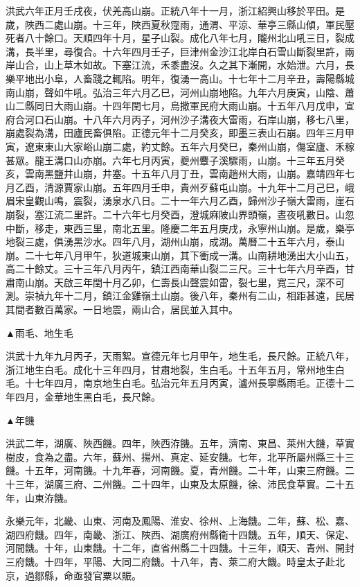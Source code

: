 \begin{pinyinscope}
洪武六年正月壬戌夜，伏羌高山崩。正統八年十一月，浙江紹興山移於平田。是歲，陜西二處山崩。十三年，陜西夏秋霪雨，通渭、平涼、華亭三縣山傾，軍民壓死者八十餘口。天順四年十月，星子山裂。成化八年七月，隴州北山吼三日，裂成溝，長半里，尋復合。十六年四月壬子，巨津州金沙江北岸白石雪山斷裂里許，兩岸山合，山上草木如故。下塞江流，禾黍盡沒。久之其下漸開，水始泄。六月，長樂平地出小阜，人畜踐之輒陷。明年，復湧一高山。十七年十二月辛丑，壽陽縣城南山崩，聲如牛吼。弘治三年六月乙巳，河州山崩地陷。九年六月庚寅，山陰、蕭山二縣同日大雨山崩。十四年閏七月，烏撒軍民府大雨山崩。十五年八月戊申，宣府合河口石山崩。十八年六月丙子，河州沙子溝夜大雷雨，石岸山崩，移七八里，崩處裂為溝，田廬民畜俱陷。正德元年十二月癸亥，即墨三表山石崩。四年三月甲寅，遼東東山大家峪山崩二處，約丈餘。五年六月癸巳，秦州山崩，傷室廬、禾稼甚眾。龍王溝口山亦崩。六年七月丙寅，夔州麞子溪驟雨，山崩。十三年五月癸亥，雲南黑鹽井山崩，井塞。十五年八月丁丑，雲南趙州大雨，山崩。嘉靖四年七月乙酉，清源賈家山崩。五年四月壬申，貴州歹蘇屯山崩。十九年十二月己巳，峨眉宋皇觀山鳴，震裂，湧泉水八日。二十一年六月乙酉，歸州沙子嶺大雷雨，崖石崩裂，塞江流二里許。二十六年七月癸酉，澄城麻陂山界頭嶺，晝夜吼數日。山忽中斷，移走，東西三里，南北五里。隆慶二年五月庚戌，永寧州山崩。是歲，樂亭地裂三處，俱湧黑沙水。四年八月，湖州山崩，成湖。萬曆二十五年六月，泰山崩。二十七年八月甲午，狄道城東山崩，其下衝成一溝。山南耕地湧出大小山五，高二十餘丈。三十三年八月丙午，鎮江西南華山裂二三尺。三十七年六月辛酉，甘肅南山崩。天啟三年閏十月乙卯，仁壽長山聲震如雷，裂七里，寬三尺，深不可測。崇禎九年十二月，鎮江金雞嶺土山崩。後八年，秦州有二山，相距甚遠，民居其間者數百萬家。一日地震，兩山合，居民並入其中。

▲雨毛、地生毛

洪武十九年九月丙子，天雨絮。宣德元年七月甲午，地生毛，長尺餘。正統八年，浙江地生白毛。成化十三年四月，甘肅地裂，生白毛。十五年五月，常州地生白毛。十七年四月，南京地生白毛。弘治元年五月丙寅，瀘州長寧縣雨毛。正德十二年四月，金華地生黑白毛，長尺餘。

▲年饑

洪武二年，湖廣、陜西饑。四年，陜西洊饑。五年，濟南、東昌、萊州大饑，草實樹皮，食為之盡。六年，蘇州、揚州、真定、延安饑。七年，北平所屬州縣三十三饑。十五年，河南饑。十九年春，河南饑。夏，青州饑。二十年，山東三府饑。二十三年，湖廣三府、二州饑。二十四年，山東及太原饑，徐、沛民食草實。二十五年，山東洊饑。

永樂元年，北畿、山東、河南及鳳陽、淮安、徐州、上海饑。二年，蘇、松、嘉、湖四府饑。四年，南畿、浙江、陜西、湖廣府州縣衛十四饑。五年，順天、保定、河間饑。十年，山東饑。十二年，直省州縣二十四饑。十三年，順天、青州、開封三府饑。十四年，平陽、大同二府饑。十八年，青、萊二府大饑。時皇太子赴北京，過鄒縣，命亟發官粟以賑。


\end{pinyinscope}
